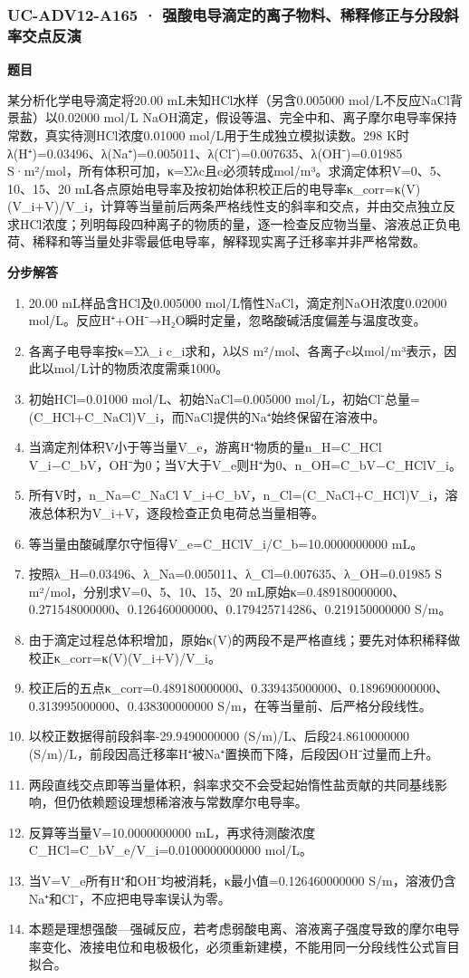 \documentclass[UTF8,11pt,a4paper]{ctexart}
\begin{document}
\subsubsection*{UC-ADV12-A165 · 强酸电导滴定的离子物料、稀释修正与分段斜率交点反演}
\noindent\textbf{题目}\par
某分析化学电导滴定将20.00 mL未知HCl水样（另含0.005000 mol/L不反应NaCl背景盐）以0.02000 mol/L NaOH滴定，假设等温、完全中和、离子摩尔电导率保持常数，真实待测HCl浓度0.01000 mol/L用于生成独立模拟读数。298 K时λ(H⁺)=0.03496、λ(Na⁺)=0.005011、λ(Cl⁻)=0.007635、λ(OH⁻)=0.01985 S·m²/mol，所有体积可加，κ=Σλc且c必须转成mol/m³。求滴定体积V=0、5、10、15、20 mL各点原始电导率及按初始体积校正后的电导率κ\_corr=κ(V)(V\_i+V)/V\_i，计算等当量前后两条严格线性支的斜率和交点，并由交点独立反求HCl浓度；列明每段四种离子的物质的量，逐一检查反应物当量、溶液总正负电荷、稀释和等当量处非零最低电导率，解释现实离子迁移率并非严格常数。\par
\medskip\noindent\textbf{分步解答}
\begin{enumerate}
\item 20.00 mL样品含HCl及0.005000 mol/L惰性NaCl，滴定剂NaOH浓度0.02000 mol/L。反应H⁺+OH⁻→H₂O瞬时定量，忽略酸碱活度偏差与温度改变。
\item 各离子电导率按κ=Σλ\_i c\_i求和，λ以S m²/mol、各离子c以mol/m³表示，因此以mol/L计的物质浓度需乘1000。
\item 初始HCl=0.01000 mol/L、初始NaCl=0.005000 mol/L，初始Cl⁻总量=(C\_HCl+C\_NaCl)V\_i，而NaCl提供的Na⁺始终保留在溶液中。
\item 当滴定剂体积V小于等当量V\_e，游离H⁺物质的量n\_H=C\_HCl V\_i−C\_bV，OH⁻为0；当V大于V\_e则H⁺为0、n\_OH=C\_bV−C\_HClV\_i。
\item 所有V时，n\_Na=C\_NaCl V\_i+C\_bV，n\_Cl=(C\_NaCl+C\_HCl)V\_i，溶液总体积为V\_i+V，逐段检查正负电荷总当量相等。
\item 等当量由酸碱摩尔守恒得V\_e=C\_HClV\_i/C\_b=10.0000000000 mL。
\item 按照λ\_H=0.03496、λ\_Na=0.005011、λ\_Cl=0.007635、λ\_OH=0.01985 S m²/mol，分别求V=0、5、10、15、20 mL原始κ=0.489180000000、0.271548000000、0.126460000000、0.179425714286、0.219150000000 S/m。
\item 由于滴定过程总体积增加，原始κ(V)的两段不是严格直线；要先对体积稀释做校正κ\_corr=κ(V)(V\_i+V)/V\_i。
\item 校正后的五点κ\_corr=0.489180000000、0.339435000000、0.189690000000、0.313995000000、0.438300000000 S/m，在等当量前、后严格分段线性。
\item 以校正数据得前段斜率-29.9490000000 (S/m)/L、后段24.8610000000 (S/m)/L，前段因高迁移率H⁺被Na⁺置换而下降，后段因OH⁻过量而上升。
\item 两段直线交点即等当量体积，斜率求交不会受起始惰性盐贡献的共同基线影响，但仍依赖题设理想稀溶液与常数摩尔电导率。
\item 反算等当量V=10.0000000000 mL，再求待测酸浓度C\_HCl=C\_bV\_e/V\_i=0.0100000000000 mol/L。
\item 当V=V\_e所有H⁺和OH⁻均被消耗，κ最小值=0.126460000000 S/m，溶液仍含Na⁺和Cl⁻，不应把电导率误认为零。
\item 本题是理想强酸—强碱反应，若考虑弱酸电离、溶液离子强度导致的摩尔电导率变化、液接电位和电极极化，必须重新建模，不能用同一分段线性公式盲目拟合。
\end{enumerate}
\end{document}
